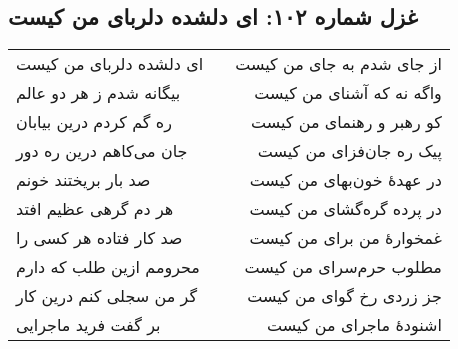 \begin{center}
\section*{غزل شماره ۱۰۲: ای دلشده دلربای من کیست}
\label{sec:102}
\begin{longtable}{l p{0.5cm} r}
ای دلشده دلربای من کیست
&&
از جای شدم به جای من کیست
\\
بیگانه شدم ز هر دو عالم
&&
واگه نه که آشنای من کیست
\\
ره گم کردم درین بیابان
&&
کو رهبر و رهنمای من کیست
\\
جان می‌کاهم درین ره دور
&&
پیک ره جان‌فزای من کیست
\\
صد بار بریختند خونم
&&
در عهدهٔ خون‌بهای من کیست
\\
هر دم گرهی عظیم افتد
&&
در پرده گره‌گشای من کیست
\\
صد کار فتاده هر کسی را
&&
غمخوارهٔ من برای من کیست
\\
محرومم ازین طلب که دارم
&&
مطلوب حرم‌سرای من کیست
\\
گر من سجلی کنم درین کار
&&
جز زردی رخ گوای من کیست
\\
بر گفت فرید ماجرایی
&&
اشنودهٔ ماجرای من کیست
\\
\end{longtable}
\end{center}
